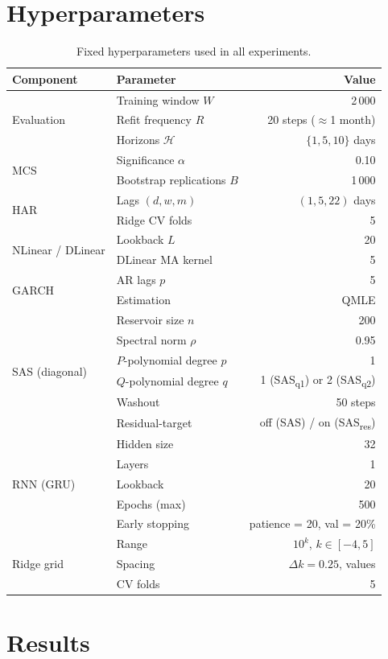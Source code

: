 \documentclass[11pt, a4paper]{article}
\begin{document}
\section{Hyperparameters}

\begin{table}[ht]
\centering
\caption{Fixed hyperparameters used in all experiments.}
\label{tab:hyperparam}
\begin{tabular}{llr}
\toprule
\textbf{Component} & \textbf{Parameter} & \textbf{Value} \\
\midrule
\multirow{3}{*}{Evaluation}
  & Training window $W$    & 2\,000 \\
  & Refit frequency $R$    & 20 steps ($\approx$1 month) \\
  & Horizons $\mathcal{H}$ & $\{1, 5, 10\}$ days \\
\midrule
\multirow{2}{*}{MCS}
  & Significance $\alpha$         & 0.10 \\
  & Bootstrap replications $B$    & 1\,000 \\
\midrule
\multirow{2}{*}{HAR}
  & Lags $(d, w, m)$ & $(1, 5, 22)$ days \\
  & Ridge CV folds   & 5 \\
\midrule
\multirow{2}{*}{NLinear / DLinear}
  & Lookback $L$      & 20 \\
  & DLinear MA kernel & 5 \\
\midrule
\multirow{2}{*}{GARCH}
  & AR lags $p$         & 5 \\
  & Estimation          & QMLE \\
\midrule
\multirow{6}{*}{SAS (diagonal)}
  & Reservoir size $n$            & 200 \\
  & Spectral norm $\rho$          & 0.95 \\
  & $P$-polynomial degree $p$     & 1 \\
  & $Q$-polynomial degree $q$     & 1 (SAS\textsubscript{q1}) or 2 (SAS\textsubscript{q2}) \\
  & Washout                       & 50 steps \\
  & Residual-target               & off (SAS) / on (SAS\textsubscript{res}) \\
\midrule
\multirow{5}{*}{RNN (GRU)}
  & Hidden size     & 32 \\
  & Layers          & 1 \\
  & Lookback        & 20 \\
  & Epochs (max)    & 500 \\
  & Early stopping  & patience = 20, val = 20\% \\
\midrule
\multirow{3}{*}{Ridge grid}
  & Range    & $10^k$, $k \in [-4, 5]$ \\
  & Spacing  & $\Delta k = 0.25$,\; 37 values \\
  & CV folds & 5 \\
\bottomrule
\end{tabular}
\end{table}

\newpage
\section{Results}
\end{document}

